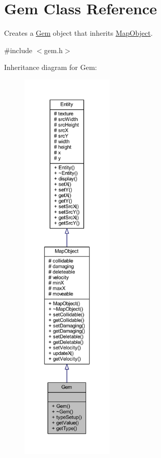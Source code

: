 \hypertarget{class_gem}{\section{Gem Class Reference}
\label{class_gem}
}


Creates a \hyperlink{class_gem}{Gem} object that inherits \hyperlink{class_map_object}{Map\+Object}.  




{\ttfamily \#include $<$gem.\+h$>$}



Inheritance diagram for Gem\+:
\nopagebreak
\begin{figure}[H]
\begin{center}
\leavevmode
\includegraphics[height=550pt]{class_gem__inherit__graph}
\end{center}
\end{figure}


